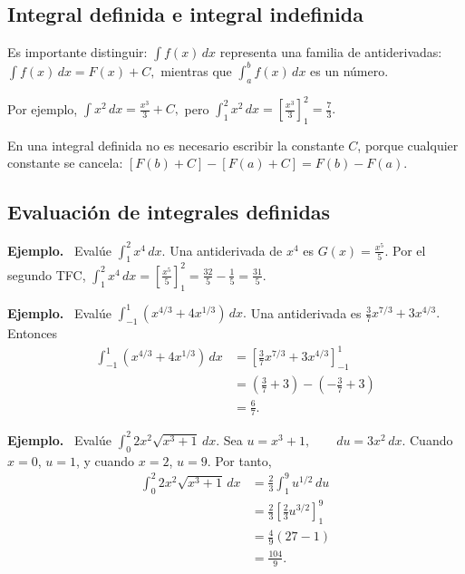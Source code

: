 \documentclass[12pt]{article}
\newenvironment{Ejem}
{\par\medskip\noindent\textbf{Ejemplo.}\ }
{\par\medskip}
\begin{document}
\subsection*{Integral definida e integral indefinida}
Es importante distinguir:
$
\int f(x)\,dx
$
representa una familia de antiderivadas:
$
\int f(x)\,dx=F(x)+C,
$
mientras que
$
\int_a^b f(x)\,dx
$
es un número.

Por ejemplo,
$
\int x^2\,dx=\frac{x^3}{3}+C,
$
pero
$
\int_1^2x^2\,dx
=
\left[\frac{x^3}{3}\right]_1^2
=
\frac73.
$

En una integral definida no es necesario escribir la constante $C$, porque
cualquier constante se cancela:
$
[F(b)+C]-[F(a)+C]=F(b)-F(a).
$
\subsection*{Evaluación de integrales definidas}
\begin{Ejem}
Evalúe
$
\int_1^2x^4\,dx.
$
Una antiderivada de $x^4$ es
$
G(x)=\frac{x^5}{5}.
$
Por el segundo TFC,
$
\int_1^2x^4\,dx
=
\left[\frac{x^5}{5}\right]_1^2
=
\frac{32}{5}-\frac15
=
\boxed{\frac{31}{5}}.
$
\end{Ejem}

\begin{Ejem}
Evalúe
$
\int_{-1}^{1}\left(x^{4/3}+4x^{1/3}\right)\,dx.
$
Una antiderivada es
$
\frac{3}{7}x^{7/3}+3x^{4/3}.
$
Entonces
\begin{align*}
\int_{-1}^{1}\left(x^{4/3}+4x^{1/3}\right)\,dx
&=
\left[
\frac{3}{7}x^{7/3}+3x^{4/3}
\right]_{-1}^{1}\\
&=
\left(\frac37+3\right)
-
\left(-\frac37+3\right)\\
&=
\boxed{\frac67}.
\end{align*}
\end{Ejem}

\begin{Ejem}
Evalúe
$
\int_0^2 2x^2\sqrt{x^3+1}\,dx.
$
Sea
$
u=x^3+1,
\qquad
du=3x^2\,dx.
$
Cuando $x=0$, $u=1$, y cuando $x=2$, $u=9$. Por tanto,
\begin{align*}
\int_0^2 2x^2\sqrt{x^3+1}\,dx
&=
\frac23\int_1^9u^{1/2}\,du\\
&=
\frac23\left[\frac23u^{3/2}\right]_1^9\\
&=
\frac49(27-1)\\
&=
\boxed{\frac{104}{9}}.
\end{align*}
\end{Ejem}
\end{document}
